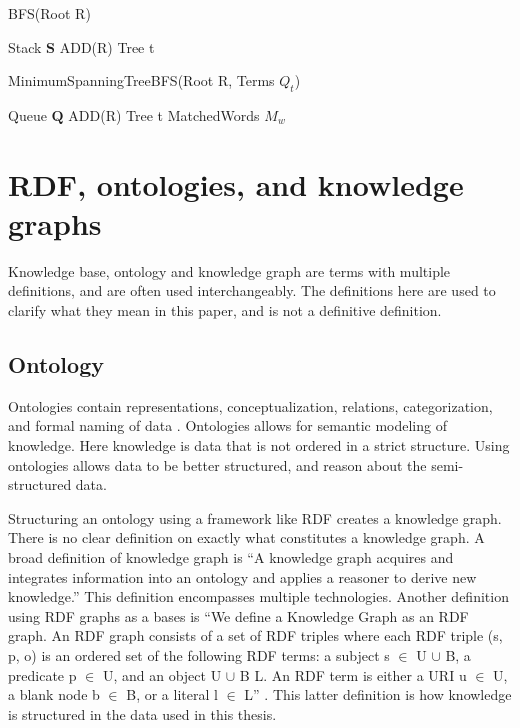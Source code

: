 \begin{algorithm}[H]
    \caption{BFS(Root R)}
    \label{DFS}
    \SetAlgoLined
    Stack $\mathbf{S}$ ADD(R)\; Tree t \;
\end{algorithm}

\begin{algorithm}[H]
    \caption{MinimumSpanningTreeBFS(Root R, Terms $Q_t$)}
    \label{MinTreeBFS}
    \SetAlgoLined
    Queue $\mathbf{Q}$ ADD(R)\; Tree t \; MatchedWords $M_w$ \;
\end{algorithm}


\section{RDF, ontologies, and knowledge graphs}
Knowledge base, ontology and knowledge graph are terms with multiple definitions, and are often used interchangeably. The definitions here are used to clarify what they mean in this paper, and is not a definitive definition.

\subsection{Ontology}
Ontologies contain representations, conceptualization, relations, categorization, and formal naming of data \cite{davies2006semantic}. Ontologies allows for semantic modeling of knowledge. Here knowledge is data that is not ordered in a strict structure. Using ontologies allows data to be better structured, and reason about the semi-structured data.

Structuring an ontology using a framework like RDF creates a knowledge graph. There is no clear definition on exactly what constitutes a knowledge graph. A broad definition of knowledge graph is ``A knowledge graph acquires and integrates information into an ontology and applies a reasoner to derive new knowledge.'' \citep{KGDef} This definition encompasses multiple technologies. Another definition using RDF graphs as a bases is ``We define a Knowledge Graph as an RDF graph. An RDF graph consists of a set of RDF triples where each RDF triple (s, p, o) is an ordered set of the following RDF terms: a subject s $\in$ U $\cup$ B, a predicate p $\in$ U, and an object U $\cup$ B  L. An RDF term is either a URI u $\in$ U, a blank node b $\in$ B, or a literal l $\in$ L'' \citep{KGDefYago}. This latter definition is how knowledge is structured in the data used in this thesis.

